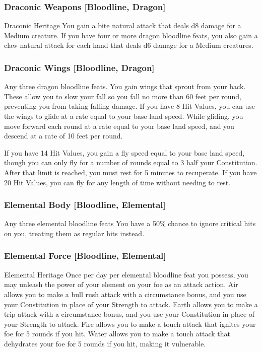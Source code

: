 \subsubsection{Draconic Weapons [Bloodline, Dragon]}
 Draconic Heritage
 You gain a bite natural attack that deals d8 damage for a Medium creature. If you have four or more dragon bloodline feats, you also gain a claw natural attack for each hand that deals d6 damage for a Medium creatures.

\subsubsection{Draconic Wings [Bloodline, Dragon]}
 Any three dragon bloodline feats.
 You gain wings that sprout from your back. These allow you to slow your fall so you fall no more than 60 feet per round, preventing you from taking falling damage. If you have 8 Hit Values, you can use the wings to glide at a rate equal to your base land speed. While gliding, you move forward each round at a rate equal to your base land speed, and you descend at a rate of 10 feet per round.

If you have 14 Hit Values, you gain a fly speed equal to your base land speed, though you can only fly for a number of rounds equal to 3 \add half your Constitution. After that limit is reached, you must rest for 5 minutes to recuperate. If you have 20 Hit Values, you can fly for any length of time without needing to rest.

\subsubsection{Elemental Body [Bloodline, Elemental]}
\featpre Any three elemental bloodline feats
\featben You have a 50\% chance to ignore critical hits on you, treating them as regular hits instead.

\subsubsection{Elemental Force [Bloodline, Elemental]}
\featpre Elemental Heritage
\featben Once per day per elemental bloodline feat you possess, you may unleash the power of your element on your foe as an attack action. Air allows you to make a bull rush attack with a  circumstance bonus, and you use your Constitution in place of your Strength to attack. Earth allows you to make a trip attack with a  circumstance bonus, and you use your Constitution in place of your Strength to attack. Fire allows you to make a touch attack that ignites your foe for 5 rounds if you hit. Water allows you to make a touch attack that dehydrates your foe for 5 rounds if you hit, making it vulnerable.

